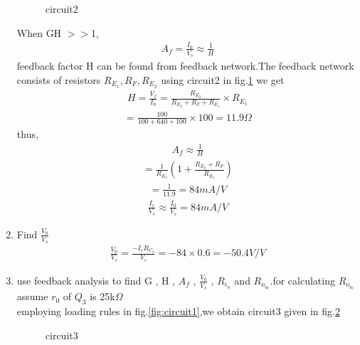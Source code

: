 \begin{enumerate}[label=\thesubsection.\arabic*.,ref=\thesubsection.\theenumi]
\begin{figure}[!ht]
\begin{center}
		\resizebox{\columnwidth}{!}{}
	\end{center}
\caption{circuit2}
\label{fig:circuit2}
\end{figure}
\solution When GH $>>$1,
\begin{align}
    A_f =\frac{I_0}{V_s}\approx \frac{1}{H}
\end{align}
feedback factor H can be found from feedback network.The feedback network consists of resistors $R_E_1,R_F,R_E_2$
using circuit2 in  fig.\ref{fig:circuit2} we get
\begin{align}
    H=\frac{V_f}{I_0}=\frac{R_E_2}{R_E_2+R_F+R_E_1} \times R_E_1
\end{align}
\begin{align}
    =\frac{100}{100+640+100}\times 100=11.9\Omega
\end{align}
thus,
\begin{align}
    A_f\approx \frac{1}{H}
\end{align}
\begin{align}
    =\frac{1}{R_E_2}(1+\frac{R_E_2+R_F}{R_E_1})
\end{align}
\begin{align}
    =\frac{1}{11.9}=84mA/V
\end{align}
\begin{align}
\label{eq:eq1}
    \frac{I_c}{V_s}\approx\frac{I_0}{V_s}=84 mA/V
\end{align}
\item Find $\frac{V_0}{V_s}$
\\
\solution 
\begin{align}
\frac{V_0}{V_s}=\frac{-I_c R_C_3}{V_s}=-84\times0.6=-50.4V/V
\end{align}
\item use feedback analysis to find G , H , $A_f$ , $\frac{V_0}{V_s}$ , $R_i_n$ and $R_o_u_t$.for calculating $R_o_u_t$ assume $r_0$ of $Q_3$ is 25k$\Omega$
\\
\solution employing loading rules in fig.\ref{fig:circuit1},we obtain circuit3 given in fig.\ref{fig:circuit3}
 \begin{figure}[!ht]
	\begin{center}
		
		\resizebox{\columnwidth}{!}{}
	\end{center}
\caption{circuit3}
\label{fig:circuit3}
\end{figure}
\begin{figure}[!ht]
	\begin{center}
		

\end{center}
\end{figure}
\end{enumerate}
